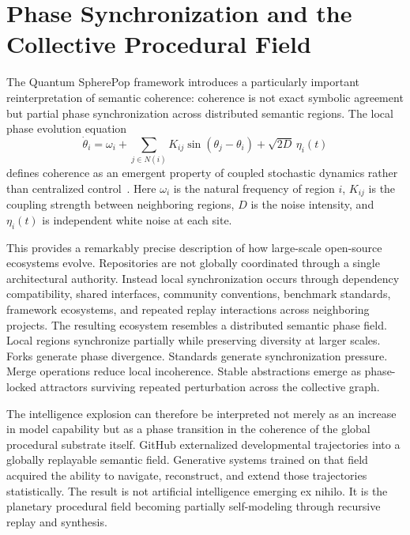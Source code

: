\documentclass[11pt]{article}
\begin{document}
\section{Phase Synchronization and the Collective Procedural Field}
\label{sec:phase}

The Quantum SpherePop framework introduces a particularly important
reinterpretation of semantic coherence: coherence is not exact symbolic
agreement but partial phase synchronization across distributed semantic regions.
The local phase evolution equation
\[
\dot{\theta}_i
=
\omega_i
+
\sum_{j \in N(i)}
K_{ij}\sin(\theta_j - \theta_i)
+
\sqrt{2D}\,\eta_i(t)
\]
defines coherence as an emergent property of coupled stochastic dynamics rather
than centralized control~\cite{kuramoto1984}. Here $\omega_i$ is the natural
frequency of region $i$, $K_{ij}$ is the coupling strength between neighboring
regions, $D$ is the noise intensity, and $\eta_i(t)$ is independent white noise
at each site.

This provides a remarkably precise description of how large-scale open-source
ecosystems evolve. Repositories are not globally coordinated through a single
architectural authority. Instead local synchronization occurs through dependency
compatibility, shared interfaces, community conventions, benchmark standards,
framework ecosystems, and repeated replay interactions across neighboring
projects. The resulting ecosystem resembles a distributed semantic phase field.
Local regions synchronize partially while preserving diversity at larger scales.
Forks generate phase divergence. Standards generate synchronization pressure.
Merge operations reduce local incoherence. Stable abstractions emerge as
phase-locked attractors surviving repeated perturbation across the collective
graph.

The intelligence explosion can therefore be interpreted not merely as an increase
in model capability but as a phase transition in the coherence of the global
procedural substrate itself. GitHub externalized developmental trajectories into
a globally replayable semantic field. Generative systems trained on that field
acquired the ability to navigate, reconstruct, and extend those trajectories
statistically. The result is not artificial intelligence emerging ex nihilo. It
is the planetary procedural field becoming partially self-modeling through
recursive replay and synthesis.
\end{document}
